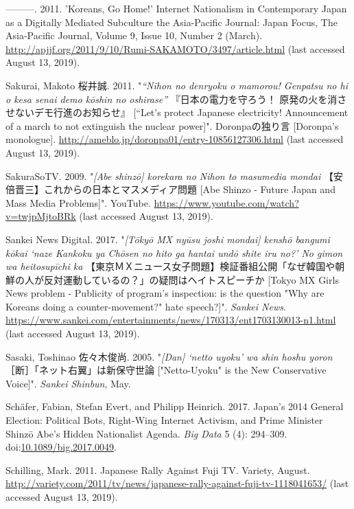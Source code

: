 \documentclass[10pt,british,A4paper,twoside]{memoir}
\begin{document}
\hypertarget{ref-sakamoto_koreans_2011}{}
---------. 2011. 'Koreans, Go Home!' Internet Nationalism in
Contemporary Japan as a Digitally Mediated Subculture the Asia-Pacific
Journal: Japan Focus, The Asia-Pacific Journal, Volume 9, Issue 10,
Number 2 (March).
\url{http://apjjf.org/2011/9/10/Rumi-SAKAMOTO/3497/article.html} (last accessed August 13, 2019).

\hypertarget{ref-sakurai__2011}{}
Sakurai, Makoto 桜井誠. 2011. "\emph{“Nihon no denryoku o mamorou! Genpatsu no hi o kesa senai demo kōshin no oshirase”} 『日本の電力を守ろう！ 原発の火を消させないデモ行進のお知らせ』 [“Let's protect Japanese electricity! Announcement of a march to not extinguish the nuclear power]". Doronpaの独り言 [Doronpa's monologue].
\url{http://ameblo.jp/doronpa01/entry-10856127306.html} (last accessed August 13, 2019).

\hypertarget{ref-sakurasotv_eng._2009}{}
SakuraSoTV. 2009. "\emph{[Abe shinzō] korekara no Nihon to masumedia mondai} 【安倍晋三】これからの日本とマスメディア問題 [Abe Shinzo - Future Japan and Mass Media Problems]". YouTube.
\url{https://www.youtube.com/watch?v=twjpMjtoBRk} (last accessed August 13, 2019).

\hypertarget{ref-sankei_digital_inc_eng._2017}{}
Sankei News Digital. 2017. "\emph{[Tōkyō MX nyūsu joshi mondai] kenshō bangumi kōkai `naze Kankoku ya Chōsen no hito ga hantai undō shite iru no?' No gimon wa heitosupīchi ka} 【東京ＭＸニュース女子問題】検証番組公開「なぜ韓国や朝鮮の人が反対運動しているの？」の疑問はヘイトスピーチか [Tokyo MX Girls News problem - Publicity of program's inspection: is the question "Why are Koreans doing a counter-movement?" hate speech?]". \emph{Sankei News}.
\url{https://www.sankei.com/entertainments/news/170313/ent1703130013-n1.html} (last accessed August 13, 2019).

\hypertarget{ref-sasaki_netto-uyoku_2005}{}
Sasaki, Toshinao 佐々木俊尚. 2005. "\emph{[Dan] `netto uyoku' wa shin hoshu yoron}［断］「ネット右翼」は新保守世論 ["Netto-Uyoku" is the New Conservative Voice]".
\emph{Sankei Shinbun}, May.

\hypertarget{ref-schafer_japans_2017}{}
Schäfer, Fabian, Stefan Evert, and Philipp Heinrich. 2017. Japan's 2014
General Election: Political Bots, Right-Wing Internet Activism, and
Prime Minister Shinzō Abe's Hidden Nationalist Agenda. \emph{Big Data} 5
(4): 294--309.
doi:\href{https://doi.org/10.1089/big.2017.0049}{10.1089/big.2017.0049}.

\hypertarget{ref-schilling_japanese_2011}{}
Schilling, Mark. 2011. Japanese Rally Against Fuji TV. Variety,
August.
\url{http://variety.com/2011/tv/news/japanese-rally-against-fuji-tv-1118041653/} (last accessed August 13, 2019).
\end{document}
